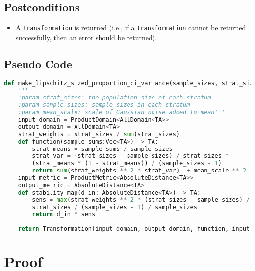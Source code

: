 \documentclass[11pt,a4paper]{article}
\begin{document}
\subsection*{Postconditions}
\begin{itemize}
    \item A \texttt{transformation} is returned (i.e., if a \texttt{transformation} cannot be returned successfully, then an error should be returned).
\end{itemize}

\subsection*{Pseudo Code}
\begin{lstlisting}[language=Python, escapechar=|]
def make_lipschitz_sized_proportion_ci_variance(sample_sizes, strat_sizes, mean_scale):
    '''
    :param strat_sizes: the population size of each stratum
    :param sample_sizes: sample sizes in each stratum 
    :param mean_scale: scale of Gaussian noise added to mean'''
    input_domain = ProductDomain<AllDomain<TA>>
    output_domain = AllDomain<TA>
    strat_weights = strat_sizes / sum(strat_sizes)
    def function(sample_sums:Vec<TA>) -> TA:
        strat_means = sample_sums / sample_sizes
        strat_var = (strat_sizes - sample_sizes) / strat_sizes * 
        (strat_means * (1 - strat_means)) / (sample_sizes - 1)
        return sum(strat_weights ** 2 * strat_var)  + mean_scale ** 2
    input_metric = ProductMetric<AbsoluteDistance<TA>>
    output_metric = AbsoluteDistance<TA>
    def stability_map(d_in: AbsoluteDistance<TA>) -> TA:
        sens = max(strat_weights ** 2 * (strat_sizes - sample_sizes) / 
        strat_sizes / (sample_sizes - 1) / sample_sizes
        return d_in * sens
    
    return Transformation(input_domain, output_domain, function, input_metric, output_metric, stability_map)        
\end{lstlisting}


\section{Proof}
\end{document}

